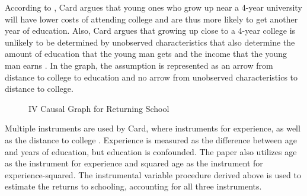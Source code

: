 \documentclass{article}\usepackage[]{graphicx}\usepackage[]{xcolor}
\begin{document}
According to \cite{christofides1995aspects}, Card argues that young ones who grow up near a 4-year university will have lower costs of attending college and are thus more likely to get another year of education. 
Also, Card argues that growing up close to a 4-year college is unlikely to be determined by unobserved characteristics that also determine the amount of education that the young man gets and the income that the young man earns \citep{card2001estimating}. 
In the graph, 
the assumption is represented as an arrow from distance to college to education and no arrow from unobserved characteristics to distance to college.


\begin{figure}[htp]
\centering
{}
\caption{IV Causal Graph for Returning School}
\label{fig:ivCard}
\end{figure}


Multiple instruments are used by Card, where instruments for experience, as well as the distance to college \citep{christofides1995aspects}. 
Experience is measured as the difference between age and years of education, 
but education is confounded. 
The paper also utilizes age as the instrument for experience and squared age as the instrument for experience-squared.
The instrumental variable procedure derived above is used to estimate the returns to schooling, accounting for all three instruments.
\end{document}

